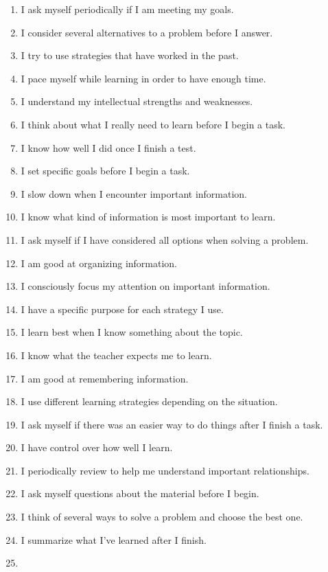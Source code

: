 \documentclass[letterpaper, nobind]{templates/ociamthesis}
\providecommand{\tightlist}{%
  \setlength{\itemsep}{0pt}\setlength{\parskip}{0pt}}
\begin{document}
\begin{enumerate}
\def\labelenumi{\arabic{enumi}.}
\tightlist
\item
  I ask myself periodically if I am meeting my goals.
\item
  I consider several alternatives to a problem before I answer.
\item
  I try to use strategies that have worked in the past.
\item
  I pace myself while learning in order to have enough time.
\item
  I understand my intellectual strengths and weaknesses.
\item
  I think about what I really need to learn before I begin a task.
\item
  I know how well I did once I finish a test.
\item
  I set specific goals before I begin a task.
\item
  I slow down when I encounter important information.
\item
  I know what kind of information is most important to learn.
\item
  I ask myself if I have considered all options when solving a problem.
\item
  I am good at organizing information.
\item
  I consciously focus my attention on important information.
\item
  I have a specific purpose for each strategy I use.
\item
  I learn best when I know something about the topic.
\item
  I know what the teacher expects me to learn.
\item
  I am good at remembering information.
\item
  I use different learning strategies depending on the situation.
\item
  I ask myself if there was an easier way to do things after I finish a task.
\item
  I have control over how well I learn.
\item
  I periodically review to help me understand important relationships.
\item
  I ask myself questions about the material before I begin.
\item
  I think of several ways to solve a problem and choose the best one.
\item
  I summarize what I've learned after I finish.
\item

\end{enumerate}
\end{document}
